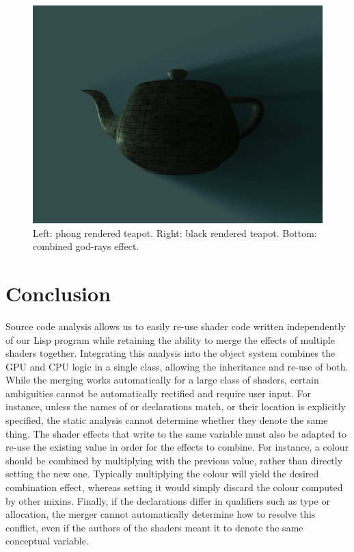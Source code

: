 \documentclass[format=sigconf]{acmart}
\begin{document}
\begin{figure}[h]
\begin{center}
\begin{minipage}{.4055\textwidth}
      \includegraphics[width=1.0\textwidth]{pass-combined.png}
    \end{minipage}
  \end{center}
  \caption{Left: phong rendered teapot. Right: black rendered teapot. Bottom: combined god-rays effect.}
  \label{fig:godrays}
\end{figure}

\section{Conclusion}\label{section:6}
Source code analysis allows us to easily re-use shader code written independently of our Lisp program while retaining the ability to merge the effects of multiple shaders together. Integrating this analysis into the object system combines the GPU and CPU logic in a single class, allowing the inheritance and re-use of both. \\

While the merging works automatically for a large class of shaders, certain ambiguities cannot be automatically rectified and require user input. For instance, unless the names of  or  declarations match, or their location is explicitly specified, the static analysis cannot determine whether they denote the same thing. The shader effects that write to the same  variable must also be adapted to re-use the existing value in order for the effects to combine. For instance, a colour should be combined by multiplying with the previous value, rather than directly setting the new one. Typically multiplying the colour will yield the desired combination effect, whereas setting it would simply discard the colour computed by other mixins. Finally, if the declarations differ in qualifiers such as type or allocation, the merger cannot automatically determine how to resolve this conflict, even if the authors of the shaders meant it to denote the same conceptual variable.
\end{document}
